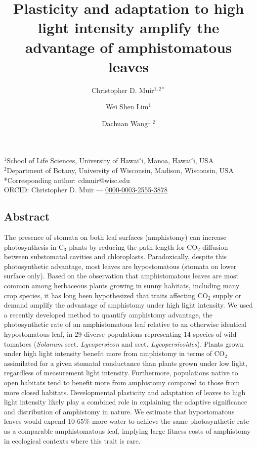 \documentclass[
  letterpaper,
  DIV=11,
  numbers=noendperiod]{scrartcl}
\title{Plasticity and adaptation to high light intensity amplify the
advantage of amphistomatous leaves}
\author{Christopher D. Muir\(^{1,2*}\) \and Wei Shen
Lim\(^{1}\) \and Dachuan Wang\(^{1,2}\)}
\date{}
\begin{document}
\maketitle


\begin{center}
$^1$School of Life Sciences, University of Hawaiʻi, Mānoa, Hawaiʻi, USA\\
$^2$Department of Botany, University of Wisconsin, Madison, Wisconsin, USA\\
\medskip
*Corresponding author: cdmuir@wisc.edu\\
\medskip
ORCID: Christopher D. Muir — \href{https://orcid.org/0000-0003-2555-3878}{0000-0003-2555-3878}\\
\end{center}

\subsection{Abstract}\label{abstract}

The presence of stomata on both leaf surfaces (amphistomy) can increase
photosynthesis in C\(_3\) plants by reducing the path length for
CO\(_2\) diffusion between substomatal cavities and chloroplasts.
Paradoxically, despite this photosynthetic advantage, most leaves are
hypostomatous (stomata on lower surface only). Based on the observation
that amphistomatous leaves are most common among herbaceous plants
growing in sunny habitats, including many crop species, it has long been
hypothesized that traits affecting CO\(_2\) supply or demand amplify the
advantage of amphistomy under high light intensity. We used a recently
developed method to quantify amphistomy advantage, the photosynthetic
rate of an amphistomatous leaf relative to an otherwise identical
hypostomatous leaf, in 29 diverse populations representing 14 species of
wild tomatoes (\emph{Solanum} sect. \emph{Lycopersicon} and sect.
\emph{Lycopersicoides}). Plants grown under high light intensity benefit
more from amphistomy in terms of CO\(_2\) assimilated for a given
stomatal conductance than plants grown under low light, regardless of
measurement light intensity. Furthermore, populations native to open
habitats tend to benefit more from amphistomy compared to those from
more closed habitats. Developmental plasticity and adaptation of leaves
to high light intensity likely play a combined role in explaining the
adaptive significance and distribution of amphistomy in nature. We
estimate that hypostomatous leaves would expend 10-65\% more water to
achieve the same photosynthetic rate as a comparable amphistomatous
leaf, implying large fitness costs of amphistomy in ecological contexts
where this trait is rare.
\end{document}
